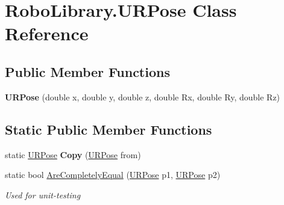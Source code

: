 \hypertarget{class_robo_library_1_1_u_r_pose}{}\section{Robo\+Library.\+U\+R\+Pose Class Reference}
\label{class_robo_library_1_1_u_r_pose}
\subsection*{Public Member Functions}
\begin{DoxyCompactItemize}
\item 
\hypertarget{class_robo_library_1_1_u_r_pose_afc38c2fa151d0a9af47416de6ba744ea}{}\label{class_robo_library_1_1_u_r_pose_afc38c2fa151d0a9af47416de6ba744ea} 
{\bfseries U\+R\+Pose} (double x, double y, double z, double Rx, double Ry, double Rz)
\end{DoxyCompactItemize}
\subsection*{Static Public Member Functions}
\begin{DoxyCompactItemize}
\item 
\hypertarget{class_robo_library_1_1_u_r_pose_acd604852491a69b9a4efdd990e2414dc}{}\label{class_robo_library_1_1_u_r_pose_acd604852491a69b9a4efdd990e2414dc} 
static \hyperlink{class_robo_library_1_1_u_r_pose}{U\+R\+Pose} {\bfseries Copy} (\hyperlink{class_robo_library_1_1_u_r_pose}{U\+R\+Pose} from)
\item 
static bool \hyperlink{class_robo_library_1_1_u_r_pose_a2300fa06e12149ca2f375fede40a8d9c}{Are\+Completely\+Equal} (\hyperlink{class_robo_library_1_1_u_r_pose}{U\+R\+Pose} p1, \hyperlink{class_robo_library_1_1_u_r_pose}{U\+R\+Pose} p2)
\begin{DoxyCompactList}\small\item\em Used for unit-\/testing \end{DoxyCompactList}\end{DoxyCompactItemize}
